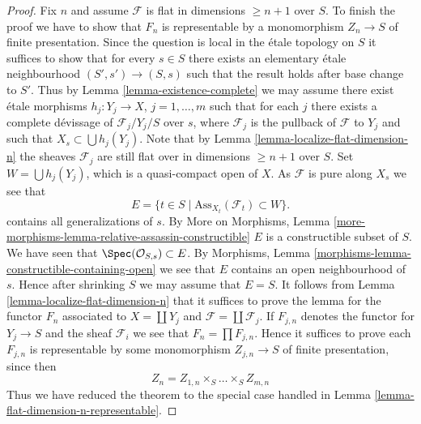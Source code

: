 \begin{proof}
\medskip\noindent
Fix $n$ and assume $\mathcal{F}$ is flat in dimensions $\geq n + 1$
over $S$. To finish the proof we have to show that $F_n$ is representable
by a monomorphism $Z_n \to S$ of finite presentation.
Since the question is local in the \'etale topology on $S$ it suffices to
show that for every $s \in S$ there exists an elementary \'etale neighbourhood
$(S', s') \to (S, s)$ such that the result holds after base change to $S'$.
Thus by
Lemma \ref{lemma-existence-complete}
we may assume there exist \'etale morphisms $h_j : Y_j \to X$,
$j = 1, \ldots, m$ such that for each $j$ there exists a complete
d\'evissage of $\mathcal{F}_j/Y_j/S$ over $s$,
where $\mathcal{F}_j$ is the pullback of $\mathcal{F}$ to $Y_j$
and such that $X_s \subset \bigcup h_j(Y_j)$. Note that by
Lemma \ref{lemma-localize-flat-dimension-n}
the sheaves $\mathcal{F}_j$ are still flat over in
dimensions $\geq n + 1$ over $S$.
Set $W = \bigcup h_j(Y_j)$, which is a quasi-compact open of $X$.
As $\mathcal{F}$ is pure along $X_s$ we see that
$$
E = \{t \in S \mid \text{Ass}_{X_t}(\mathcal{F}_t) \subset W \}.
$$
contains all generalizations of $s$. By
More on Morphisms,
Lemma \ref{more-morphisms-lemma-relative-assassin-constructible}
$E$ is a constructible subset of $S$. We have seen that
$\Spec(\mathcal{O}_{S, s}) \subset E$. By
Morphisms, Lemma \ref{morphisms-lemma-constructible-containing-open}
we see that $E$ contains an open neighbourhood of $s$.
Hence after shrinking $S$ we may assume that $E = S$.
It follows from
Lemma \ref{lemma-localize-flat-dimension-n}
that it suffices to prove the lemma for the functor $F_n$ associated to
$X = \coprod Y_j$ and $\mathcal{F} = \coprod \mathcal{F}_j$.
If $F_{j, n}$ denotes the functor for $Y_j \to S$ and the sheaf
$\mathcal{F}_i$ we see that $F_n = \prod F_{j, n}$. Hence it suffices
to prove each $F_{j, n}$ is representable by some monomorphism
$Z_{j, n} \to S$ of finite presentation, since then
$$
Z_n = Z_{1, n} \times_S \ldots \times_S Z_{m, n}
$$
Thus we have reduced the theorem to the special case handled in
Lemma \ref{lemma-flat-dimension-n-representable}.
\end{proof}